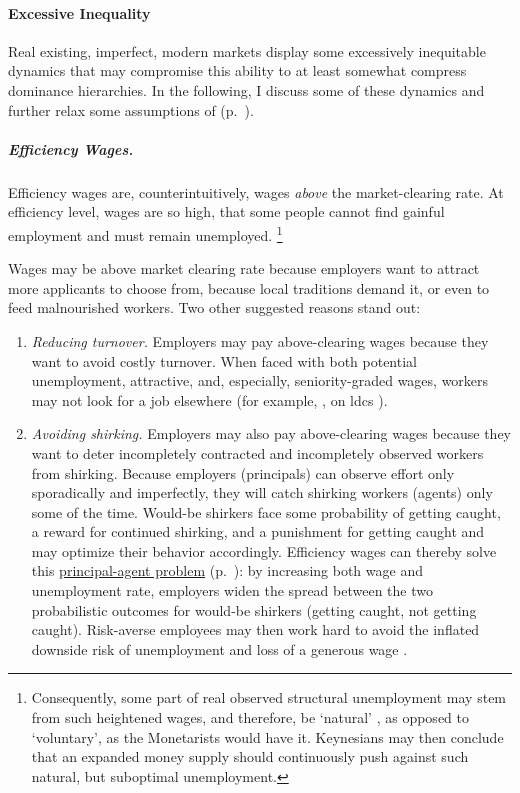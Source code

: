 \paragraph{Excessive Inequality}
	\label{sec:inequality-dynamics}
Real existing, imperfect, modern markets display some excessively inequitable dynamics that may compromise this ability to at least somewhat compress dominance hierarchies.
In the following, I discuss some of these dynamics and further relax some assumptions of   (p.~\pageref{sec:perfect-competition}).

\subparagraph[Efficiency Wages]{Efficiency Wages.}
	\label{sec:efficiency-wages}
Efficiency wages are, counterintuitively, wages \emph{above} the market-clearing rate.
At efficiency level, wages are so high, that some people cannot find gainful employment and must remain unemployed.
\footnote{
	Consequently, some part of real observed structural unemployment may stem from such heightened wages, and therefore, be `natural' \citep{Schlicht1978}, as opposed to `voluntary', as the Monetarists would have it.
	Keynesians may then conclude that an expanded money supply should continuously push against such natural, but suboptimal unemployment.
}

Wages may be above market clearing rate because employers want to attract more applicants to choose from, because local traditions demand it, or even to feed malnourished workers.
Two other suggested reasons stand out:

\begin{enumerate}
	\item \emph{Reducing turnover.}
	Employers may pay above-clearing wages because they want to avoid costly turnover.
	When faced with both potential unemployment, attractive, and, especially, seniority-graded wages, workers may not look for a job elsewhere (for example, \citealt{Salop1979}, on \glspl{ldc} \citealt{Stiglitz1974a}).

	\item \emph{Avoiding shirking.}
	Employers may also pay above-clearing wages because they want to deter incompletely contracted and incompletely observed workers from shirking.
	Because employers (principals) can observe effort only sporadically and imperfectly, they will catch shirking workers (agents) only some of the time.
	Would-be shirkers face some probability of getting caught, a reward for continued shirking, and a punishment for getting caught and may optimize their behavior accordingly.
	Efficiency wages can thereby solve this \hyperref[sec:principal-agent-problem]{principal-agent problem} (p.~\pageref{sec:principal-agent-problem}):
	by increasing both wage and unemployment rate, employers widen the spread between the two probabilistic outcomes for would-be shirkers (getting caught, not getting caught).
	Risk-averse employees may then work hard to avoid the inflated downside risk of unemployment and loss of a generous wage \citep{Stiglitz1984}.
\end{enumerate}

